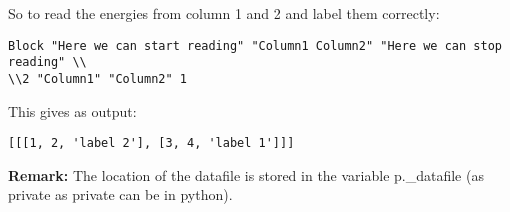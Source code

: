 \documentclass[a4paper, fleqn]{article}
\begin{document}
So to read the energies from column 1 and 2 and label them correctly:
\begin{verbatim}
Block "Here we can start reading" "Column1 Column2" "Here we can stop reading" \\
\\2 "Column1" "Column2" 1
\end{verbatim} 
This gives as output:
\begin{verbatim}
[[[1, 2, 'label 2'], [3, 4, 'label 1']]]
\end{verbatim}
\textbf{Remark:} The location of the datafile is stored in the variable p.\_datafile (as private as private can be in python).
\end{document}
